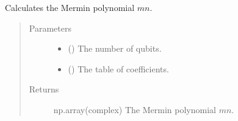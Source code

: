 \documentclass[letterpaper,10pt,english]{sphinxmanual}
\begin{document}
\begin{fulllineitems}
\label{\detokenize{mermin_polynomials-opti:mermin_on_qiskit.hypergraphstates_optimization.mermin_polynomials.mermin}}
Calculates the Mermin polynomial \(mn\).
\begin{quote}\begin{description}
\item[{Parameters}] \leavevmode\begin{itemize}
\item {} 
 () \textendash{} The number of qubits.

\item {} 
 (\sphinxstyleliteralemphasis{\sphinxupquote{(}}\sphinxstyleliteralemphasis{\sphinxupquote{(}}\sphinxstyleliteralemphasis{\sphinxupquote{)}}\sphinxstyleliteralemphasis{\sphinxupquote{)}}) \textendash{} The table of coefficients.

\end{itemize}

\item[{Returns}] \leavevmode
np.array(complex) \textendash{} The Mermin polynomial \(mn\).

\end{description}\end{quote}

\end{fulllineitems}

\end{document}
